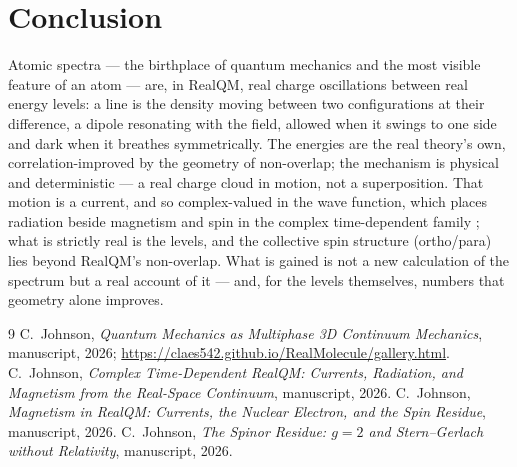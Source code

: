 \documentclass[11pt]{article}
\begin{document}
\section{Conclusion}
\label{sec:concl}

Atomic spectra --- the birthplace of quantum mechanics and the most visible feature of an atom --- are, in
RealQM, real charge oscillations between real energy levels: a line is the density moving between two
configurations at their difference, a dipole resonating with the field, allowed when it swings to one side
and dark when it breathes symmetrically. The energies are the real theory's own, correlation-improved by the
geometry of non-overlap; the mechanism is physical and deterministic --- a real charge cloud in motion, not a
superposition. That motion is a current, and so complex-valued in the wave function, which places radiation
beside magnetism and spin in the complex time-dependent family \cite{ComplexRealQM,Magnetism,Spinor}; what is
strictly real is the levels, and the collective spin structure (ortho/para) lies beyond RealQM's non-overlap.
What is gained is not a new calculation of the spectrum but a real account of it --- and, for the levels
themselves, numbers that geometry alone improves.

\begin{thebibliography}{9}
 C.~Johnson, \emph{Quantum Mechanics as Multiphase 3D Continuum Mechanics}, manuscript,
2026; \url{https://claes542.github.io/RealMolecule/gallery.html}.
 C.~Johnson, \emph{Complex Time-Dependent RealQM: Currents, Radiation, and Magnetism
from the Real-Space Continuum}, manuscript, 2026.
 C.~Johnson, \emph{Magnetism in RealQM: Currents, the Nuclear Electron, and the Spin
Residue}, manuscript, 2026.
 C.~Johnson, \emph{The Spinor Residue: $g=2$ and Stern--Gerlach without Relativity},
manuscript, 2026.
\end{thebibliography}
\end{document}

